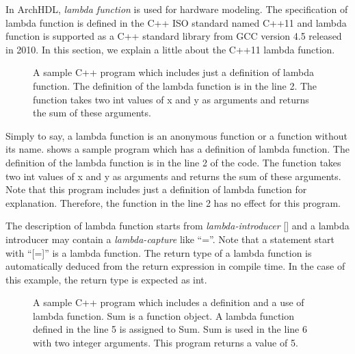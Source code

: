 In ArchHDL, \textit{lambda function} is used for hardware modeling.
The specification of lambda function is defined in the C++ ISO standard
named C++11 and
lambda function is supported as a C++ standard library from GCC version 4.5
released in 2010.
In this section,
we explain a little about the C++11 lambda function.

\begin{figure}[t]
 
\caption{A sample C++ program which includes just a definition of lambda function.
The definition of the lambda function is in the line 2.
The function takes two int values of x and y as arguments and returns the sum of these arguments.}
 \label{src:lambda1}
\end{figure}

Simply to say, a lambda function is an anonymous function or
a function without its name.
 shows
a sample program which has a definition of lambda function.
The definition of the lambda function is in the line 2 of the code.
The function takes two int values of x and y as arguments
and returns the sum of these arguments.
Note that this program includes just a definition of lambda function
for explanation.
Therefore, the function in the line 2 has no effect for this program.

The description of lambda function starts from \textit{lambda-introducer} []
and a lambda introducer may contain a \textit{lambda-capture} like ``=''.
Note that a statement start with ``[=]'' is a lambda function.
The return type of a lambda function is automatically deduced from
the return expression in compile time.
In the case of this example, the return type is expected as int.

\begin{figure}[t]
 
 \caption{
A sample C++ program which includes a definition and a use of lambda function.
Sum is a function object. A lambda function defined in the line 5 is
assigned to Sum. Sum is used in the line 6 with two integer arguments.
This program returns a value of 5.}
 \label{src:lambda2}
\end{figure}

